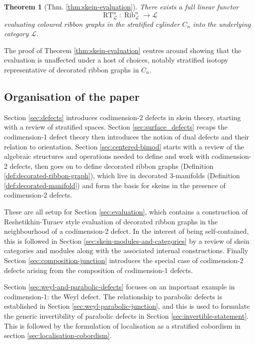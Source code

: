 \documentclass[a4paper]{article}
\numberwithin{equation}{section}
\newtheorem*{theorem*}{Theorem}
\newcommand{\1}{{\mathrm{1}\mkern-4mu{\mathchoice{}{}{\mskip-0.5mu}{\mskip-1mu}}\mathrm{l}}}
\renewcommand{\L}{\mathcal{L}}
\DeclareMathOperator{\RT}{RT} %
\DeclareMathOperator{\Rib}{Rib}
\begin{document}
\begin{theorem*}[Thm. \ref{thm:skein-evaluation}] There exists a full linear functor $$\RT^n_\L : \Rib_\L^n \to \L$$ evaluating coloured ribbon graphs in the stratified cylinder $C_n$ into the underlying category $\L$.
\end{theorem*}

The proof of Theorem \ref{thm:skein-evaluation} centres around showing that the evaluation is unaffected under a host of choices, notably stratified isotopy representative of decorated ribbon graphs in $C_n$. 

\subsection{Organisation of the paper}\label{sec:organisation}

Section \ref{sec:defects} introduces codimension-2 defects in skein theory, starting with a review of stratified spaces. Section \ref{sec:surface_defects} recaps the codimension-1 defect theory then introduces the notion of dual defects and their relation to orientation.
Section \ref{sec:centered-bimod} starts with a review of the algebraic structures and operations needed to define and work with codimension-2 defects, then goes on to define decorated ribbon graphs (Definition \ref{def:decorated-ribbon-graph}), which live in decorated 3-manifolds (Definition \ref{def:decorated-manifold}) and form the basis for skeins in the presence of codimension-2 defects.

These are all setup for Section \ref{sec:evaluation}, which contains a construction of Reshetikhin-Turaev style evaluation of decorated ribbon graphs in the neighbourhood of a codimension-2 defect. In the interest of being self-contained, this is followed in Section \ref{sec:skein-modules-and-categories} by a review of skein categories and modules along with the associated internal constructions. Finally Section \ref{sec:composition-junction} introduces the special case of codimension-2 defects arising from the composition of codimension-1 defects.

Section \ref{sec:weyl-and-parabolic-defects} focuses on an important example in codimension-1: the Weyl defect. The relationship to parabolic defects is established in Section \ref{sec:weyl-parabolic-junction}, and this is used to formulate the generic invertibility of parabolic defects in Section \ref{sec:invertible-statement}. This is followed by the formulation of localisation as a stratified cobordism in section \ref{sec:localisation-cobordism}.
\end{document}

